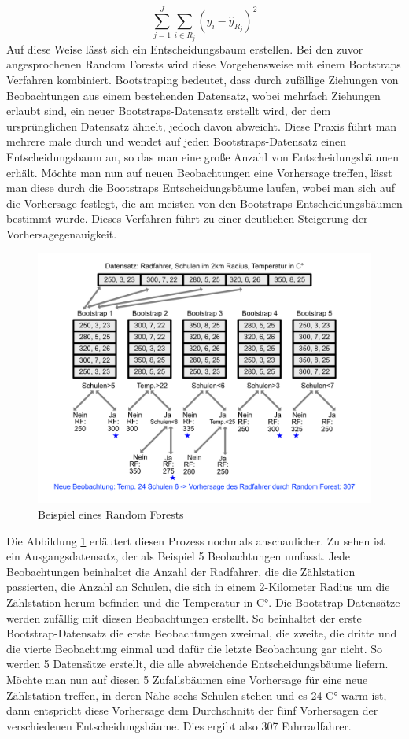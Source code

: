 \documentclass[a4paper,12pt]{thesis}
\begin{document}
\begin{equation}
	\label{TDM:TreeOptimization}
	\sum_{j=1}^J\sum_{i\in R_j}(y_i - \hat{y}_{R_j})^2
\end{equation}
Auf diese Weise lässt sich ein Entscheidungsbaum erstellen. Bei den zuvor angesprochenen Random Forests wird diese Vorgehensweise mit einem Bootstraps Verfahren kombiniert. Bootstraping bedeutet, dass durch zufällige Ziehungen von Beobachtungen aus einem bestehenden Datensatz, wobei mehrfach Ziehungen erlaubt sind, ein neuer Bootstraps-Datensatz erstellt wird, der dem ursprünglichen Datensatz ähnelt, jedoch davon abweicht. Diese Praxis führt man mehrere male durch und wendet auf jeden Bootstraps-Datensatz einen Entscheidungsbaum an, so das man eine große Anzahl von Entscheidungsbäumen erhält. Möchte man nun auf neuen Beobachtungen eine Vorhersage treffen, lässt man diese durch die Bootstraps Entscheidungsbäume laufen, wobei man sich auf die Vorhersage festlegt, die am meisten von den Bootstraps Entscheidungsbäumen bestimmt wurde. Dieses Verfahren führt zu einer deutlichen Steigerung der Vorhersagegenauigkeit.

\begin{figure}[!ht]
	\centering
	\includegraphics[width=14cm]{Plots/Random_Forests.png}
	\caption{Beispiel eines Random Forests}
	\label{RF2}
\end{figure}

Die Abbildung \ref{RF2} erläutert diesen Prozess nochmals anschaulicher. Zu sehen ist ein Ausgangsdatensatz, der als Beispiel 5 Beobachtungen umfasst. Jede Beobachtungen beinhaltet die Anzahl der Radfahrer, die die Zählstation passierten, die Anzahl an Schulen, die sich in einem 2-Kilometer Radius um die Zählstation herum befinden und die Temperatur in C°. Die Bootstrap-Datensätze werden zufällig mit diesen Beobachtungen erstellt. So beinhaltet der erste Bootstrap-Datensatz die erste Beobachtungen zweimal, die zweite, die dritte und die vierte Beobachtung einmal und dafür die letzte Beobachtung gar nicht. So werden 5 Datensätze erstellt, die alle abweichende Entscheidungsbäume liefern. Möchte man nun auf diesen 5 Zufallsbäumen eine Vorhersage für eine neue Zählstation treffen, in deren Nähe sechs Schulen stehen und es 24 C° warm ist, dann entspricht diese Vorhersage dem Durchschnitt der fünf Vorhersagen der verschiedenen Entscheidungsbäume. Dies ergibt also 307 Fahrradfahrer.
\end{document}
